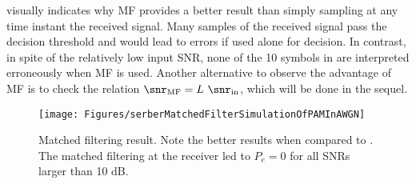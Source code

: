 

 visually indicates why MF provides a better result than simply sampling at any time instant the received signal. Many samples of the received signal pass the decision threshold and would lead to errors if used alone for decision. In contrast, in spite of the relatively low input SNR, none of the 10 symbols in  are interpreted erroneously when MF is used. Another alternative to observe the advantage of MF is to check the relation $\snr_\textrm{MF} = L \textrm{~} \snr_\textrm{in}$, which will be done in the sequel.

\begin{figure}[htbp]
\centering
\texttt{[image: Figures/serberMatchedFilterSimulationOfPAMInAWGN]}
\caption[{Matched filtering result. Note the better results when compared to .}]{Matched filtering result. Note the better results when compared to . The matched filtering at the receiver led to $P_e=0$ for all SNRs larger than 10 dB.\label{fig:serberMatchedFilterSimulationOfPAMInAWGN}}
\end{figure}

